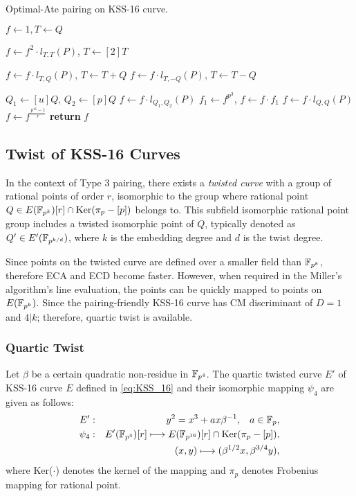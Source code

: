 \begin{algorithm}[ht]
	\caption{Optimal-Ate pairing on KSS-16 curve.}
	\label{indo_kss16_optimal_algo}
	\DontPrintSemicolon

	
	 $f \leftarrow 1,T \leftarrow Q$\;
	  {
	 $f\leftarrow f^2\cdot l_{T,T}(P)$, $T\leftarrow [2]T$\;

	  {
	 $f\leftarrow f\cdot l_{T,Q}(P)$, $T\leftarrow T+Q$}
      {
	 $f\leftarrow f\cdot l_{T,-Q}(P)$, $T\leftarrow T-Q$}}
  
	 $Q_1\leftarrow [u]Q$, $Q_2\leftarrow [p]Q$\;
	 $f\leftarrow f\cdot l_{Q_1,Q_2}(P)$\;
	 $f_1\leftarrow f^{p^3}$, $f\leftarrow f\cdot f_1$\;
	 $f\leftarrow f\cdot l_{Q,Q}(P)$\;
	 $f\leftarrow f^{\frac{p^{16}-1}{r}}$\;
	 {\bf return} $f$\;
\end{algorithm}
\vspace{-0.6em}


\subsection{Twist of KSS-16 Curves} 
In the context of  Type 3 pairing, there exists a \textit{twisted curve} with a group of rational points of order $r$, isomorphic to the group where rational point $Q \in  E({\mathbb{F}}_{p^{k}}) [r] \cap \text{Ker}(\pi_p - [p])$  belongs to. This subfield isomorphic rational point group includes a twisted isomorphic point of $Q$, typically denoted as $Q' \in E'(\mathbb{F}_{p^{k/d}})$, where $k$ is the embedding degree and $d$ is the twist degree.  

Since points on the twisted curve are defined over a smaller field than $\mathbb{F}_{p^k}$, therefore ECA and ECD become faster. 
However, when required in the Miller's algorithm's line evaluation, the points can be quickly mapped to points on $E(\mathbb{F}_{p^k} )$. 
Since the pairing-friendly KSS-16 \cite{EPRINT:KacSchSco07} curve has CM discriminant of $D = 1$ and $4|k$; therefore, quartic twist is available.
\subsubsection{Quartic Twist} 
\label{sec:ch:indo:Quartic_twist}
Let $\beta$ be a certain quadratic non-residue in $\mathbb{F}_{p^4}$.  The quartic twisted curve $E'$ of KSS-16  curve $E$ defined in \eqref{eq:KSS_16} and  their isomorphic mapping $\psi_4$ are given as follows:
\begin{eqnarray}
	E'&:&y^2=x^3+ax\beta^{-1},\;\;\;a\in{\mathbb{F}}_{p}, \nonumber\\
	\psi_4&:&E'(\mathbb{F}_{p^4})[r] \longmapsto E(\mathbb{F}_{p^{16}})[r]\cap {\rm Ker}(\pi_p-[p]),\nonumber\\
	&&(x,y)\longmapsto (\beta^{1/2}x,\beta^{3/4}y),\label{kss16_quartic_twisted_map}
\end{eqnarray}
where Ker($\cdot$) denotes the kernel of the mapping and $\pi_p$ denotes Frobenius mapping  for rational point.

